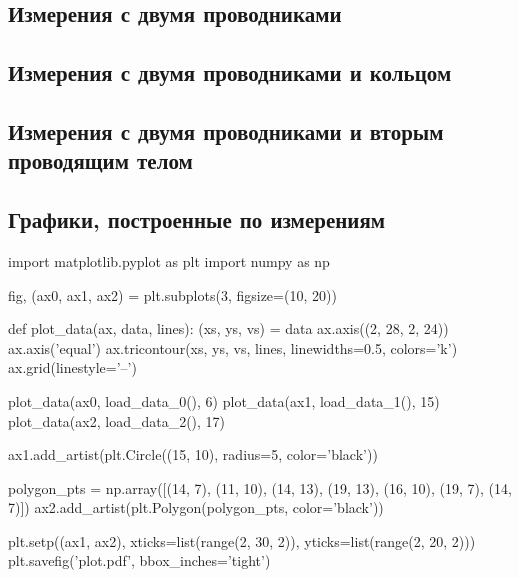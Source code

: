 \documentclass[12pt, a4paper]{article}
\begin{document}
\subsection*{Измерения с двумя проводниками}


\subsection*{Измерения с двумя проводниками и кольцом}

\begin{table}[H]
\end{table} 

\subsection*{Измерения с двумя проводниками и вторым проводящим телом}

\begin{table}[H]
\end{table} 

\subsection*{Графики, построенные по измерениям}

\begin{pycode}
import matplotlib.pyplot as plt
import numpy as np

fig, (ax0, ax1, ax2) = plt.subplots(3, figsize=(10, 20))

def plot_data(ax, data, lines):
  (xs, ys, vs) = data
  ax.axis((2, 28, 2, 24))
  ax.axis('equal')
  ax.tricontour(xs, ys, vs, lines, linewidths=0.5, colors='k')
  ax.grid(linestyle='--')
  
plot_data(ax0, load_data_0(), 6)
plot_data(ax1, load_data_1(), 15)
plot_data(ax2, load_data_2(), 17)

ax1.add_artist(plt.Circle((15, 10), radius=5, color='black'))

polygon_pts = np.array([(14, 7), (11, 10), (14, 13), (19, 13), (16, 10), (19, 7), (14, 7)])
ax2.add_artist(plt.Polygon(polygon_pts, color='black'))

plt.setp((ax1, ax2), xticks=list(range(2, 30, 2)), yticks=list(range(2, 20, 2)))
plt.savefig('plot.pdf', bbox_inches='tight')
\end{pycode}
\end{document}
